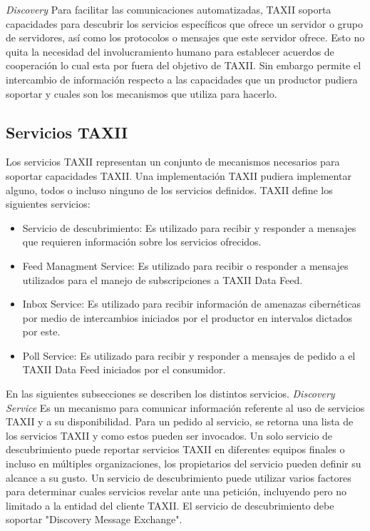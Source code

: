 \emph{Discovery}
Para facilitar las comunicaciones automatizadas, TAXII soporta capacidades para 
descubrir los servicios específicos que ofrece un servidor o grupo de 
servidores, así como los protocolos o mensajes que este servidor ofrece. Esto no 
quita la necesidad del involucramiento humano para establecer acuerdos de 
cooperación lo cual esta por fuera del objetivo de TAXII. Sin embargo permite el 
intercambio de información respecto a las capacidades que un productor pudiera 
soportar y cuales son los mecanismos que utiliza para hacerlo.


\subsection{Servicios TAXII}
Los servicios TAXII representan un conjunto de mecanismos necesarios para 
soportar capacidades TAXII. Una implementación TAXII pudiera implementar alguno, 
todos o incluso ninguno de los servicios definidos.
TAXII define los siguientes servicios:
\begin{itemize}
  \item Servicio de descubrimiento: Es utilizado para recibir y responder a 
  mensajes que requieren información sobre los servicios ofrecidos.
  \item Feed Managment Service: Es utilizado para recibir o responder a mensajes 
  utilizados para el manejo de subscripciones a TAXII Data Feed.
  \item Inbox Service: Es utilizado para recibir información de amenazas 
  cibernéticas por medio de intercambios iniciados por el productor en intervalos 
  dictados por este.
  \item Poll Service: Es utilizado para recibir y responder a mensajes de pedido 
  a el TAXII Data Feed iniciados por el consumidor.
\end{itemize}
En las siguientes subsecciones se describen los distintos servicios.
\emph{Discovery Service}
Es un mecanismo para comunicar información referente al uso de servicios TAXII y 
a su disponibilidad. Para un pedido al servicio, se retorna una lista de los 
servicios TAXII y como estos pueden ser invocados. Un solo servicio de 
descubrimiento puede reportar servicios TAXII en diferentes equipos finales o 
incluso en múltiples organizaciones, los propietarios del servicio pueden 
definir su alcance a su gusto. Un servicio de descubrimiento puede utilizar 
varios factores para determinar cuales servicios revelar ante una petición, 
incluyendo pero no limitado a la entidad del cliente TAXII.
El servicio de descubrimiento debe soportar "Discovery Message Exchange".


